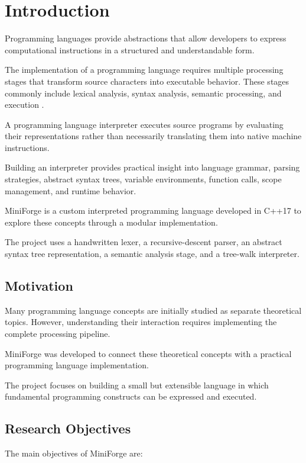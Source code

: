 \documentclass[conference]{IEEEtran}
\begin{document}
\section{Introduction}

Programming languages provide abstractions that allow
developers to express computational instructions in
a structured and understandable form.

The implementation of a programming language requires
multiple processing stages that transform source
characters into executable behavior. These stages
commonly include lexical analysis, syntax analysis,
semantic processing, and execution \cite{aho,dragon,crafting}.

A programming language interpreter executes source
programs by evaluating their representations rather
than necessarily translating them into native machine
instructions.

Building an interpreter provides practical insight
into language grammar, parsing strategies, abstract
syntax trees, variable environments, function calls,
scope management, and runtime behavior.

MiniForge is a custom interpreted programming language
developed in C++17 to explore these concepts through
a modular implementation.

The project uses a handwritten lexer, a recursive-descent
parser, an abstract syntax tree representation, a
semantic analysis stage, and a tree-walk interpreter.

\subsection{Motivation}

Many programming language concepts are initially studied
as separate theoretical topics. However, understanding
their interaction requires implementing the complete
processing pipeline.

MiniForge was developed to connect these theoretical
concepts with a practical programming language
implementation.

The project focuses on building a small but extensible
language in which fundamental programming constructs
can be expressed and executed.

\subsection{Research Objectives}

The main objectives of MiniForge are:
\end{document}

